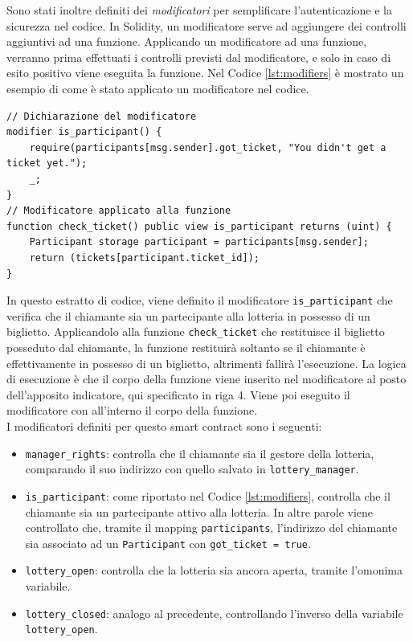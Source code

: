 \documentclass[12pt,a4paper,openright,twoside]{report}
\begin{document}
Sono stati inoltre definiti dei \textit{modificatori} per semplificare l'autenticazione e la sicurezza nel codice. In Solidity, un modificatore serve ad aggiungere dei controlli aggiuntivi ad una funzione. Applicando un modificatore ad una funzione, verranno prima effettuati i controlli previsti dal modificatore, e solo in caso di esito positivo viene eseguita la funzione.
Nel Codice \ref{lst:modifiers} è mostrato un esempio di come è stato applicato un modificatore nel codice.
\begin{lstlisting}[language=Solidity, caption=Utilizzo dei modificatori, label={lst:modifiers}]
// Dichiarazione del modificatore
modifier is_participant() {
    require(participants[msg.sender].got_ticket, "You didn't get a ticket yet.");
    _;
}
// Modificatore applicato alla funzione
function check_ticket() public view is_participant returns (uint) {
    Participant storage participant = participants[msg.sender];
    return (tickets[participant.ticket_id]);
}
\end{lstlisting}
In questo estratto di codice, viene definito il modificatore \texttt{is\_participant} che verifica che il chiamante sia un partecipante alla lotteria in possesso di un biglietto. Applicandolo alla funzione \texttt{check\_ticket} che restituisce il biglietto posseduto dal chiamante, la funzione restituirà soltanto se il chiamante è effettivamente in possesso di un biglietto, altrimenti fallirà l'esecuzione. La logica di esecuzione è che il corpo della funzione viene inserito nel modificatore al posto dell'apposito indicatore, qui specificato in riga 4. Viene poi eseguito il modificatore con all'interno il corpo della funzione.\\ 
I modificatori definiti per questo smart contract sono i seguenti:
\begin{itemize}
    \item \texttt{manager\_rights}: controlla che il chiamante sia il gestore della lotteria, comparando il suo indirizzo con quello salvato in \texttt{lottery\_manager}.
    \item \texttt{is\_participant}: come riportato nel Codice \ref{lst:modifiers}, controlla che il chiamante sia un partecipante attivo alla lotteria. In altre parole viene controllato che, tramite il mapping \texttt{participants}, l'indirizzo del chiamante sia associato ad un \texttt{Participant} con \texttt{got\_ticket = true}.
    \item \texttt{lottery\_open}: controlla che la lotteria sia ancora aperta, tramite l'omonima variabile.
    \item \texttt{lottery\_closed}: analogo al precedente, controllando l'inverso della variabile \texttt{lottery\_open}.
\end{itemize}
\end{document}
